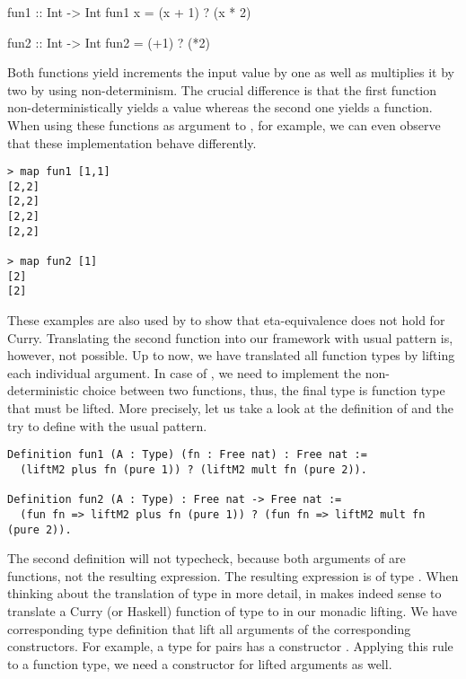 {\begin{curry}
fun1 :: Int -> Int
fun1 x = (x + 1) ? (x * 2)

fun2 :: Int -> Int
fun2 = (+1) ? (*2)
\end{curry}

Both functions yield increments the input value by one as well as multiplies it by two by using non-determinism.
The crucial difference is that the first function non-deterministically yields a value whereas the second one yields a function.
When using these functions as argument to , for example, we can even observe that these implementation behave differently.

\begin{verbatim}
> map fun1 [1,1]
[2,2]
[2,2]
[2,2]
[2,2]

> map fun2 [1]
[2]
[2]
\end{verbatim}

These examples are also used by \citet{mehner2014parametricity} to show that eta-equivalence does not hold for Curry.
Translating the second function into our framework with usual pattern is, however, not possible.
Up to now, we have translated all function types by lifting each individual argument.
In case of , we need to implement the non-deterministic choice between two functions, thus, the final type is function type that must be lifted.
More precisely, let us take a look at the definition of  and the try to define  with the usual pattern.

\begin{verbatim}
Definition fun1 (A : Type) (fn : Free nat) : Free nat :=
  (liftM2 plus fn (pure 1)) ? (liftM2 mult fn (pure 2)).

Definition fun2 (A : Type) : Free nat -> Free nat :=
  (fun fn => liftM2 plus fn (pure 1)) ? (fun fn => liftM2 mult fn (pure 2)).
\end{verbatim}

The second definition will not typecheck, because both arguments of  are functions, not the resulting expression.
The resulting expression is of type .
When thinking about the translation of type in more detail, in makes indeed sense to translate a Curry (or Haskell) function of type  to  in our monadic lifting.
We have corresponding type definition that lift all arguments of the corresponding constructors.
For example, a type for pairs has a constructor .
Applying this rule to a function type, we need a constructor for lifted arguments as well.

}

